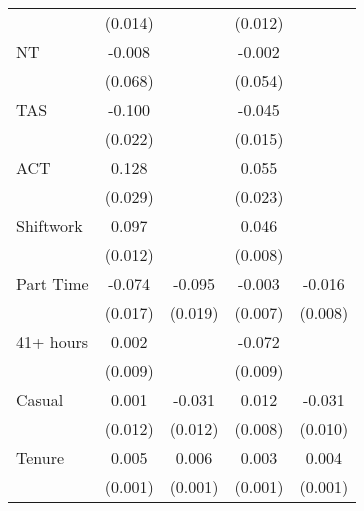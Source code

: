 {\begin{tabular}{l*{4}{c}}
                    &     (0.014)         &                     &     (0.012)         &                     \\
[1em]
NT                  &      -0.008         &                     &      -0.002         &                     \\
                    &     (0.068)         &                     &     (0.054)         &                     \\
[1em]
TAS                 &      -0.100\sym{***}&                     &      -0.045\sym{**} &                     \\
                    &     (0.022)         &                     &     (0.015)         &                     \\
[1em]
ACT                 &       0.128\sym{***}&                     &       0.055\sym{*}  &                     \\
                    &     (0.029)         &                     &     (0.023)         &                     \\
[1em]
Shiftwork           &       0.097\sym{***}&                     &       0.046\sym{***}&                     \\
                    &     (0.012)         &                     &     (0.008)         &                     \\
[1em]
Part Time           &      -0.074\sym{***}&      -0.095\sym{***}&      -0.003         &      -0.016\sym{*}  \\
                    &     (0.017)         &     (0.019)         &     (0.007)         &     (0.008)         \\
[1em]
41+ hours           &       0.002         &                     &      -0.072\sym{***}&                     \\
                    &     (0.009)         &                     &     (0.009)         &                     \\
[1em]
Casual              &       0.001         &      -0.031\sym{*}  &       0.012         &      -0.031\sym{**} \\
                    &     (0.012)         &     (0.012)         &     (0.008)         &     (0.010)         \\
[1em]
Tenure              &       0.005\sym{***}&       0.006\sym{***}&       0.003\sym{***}&       0.004\sym{***}\\
                    &     (0.001)         &     (0.001)         &     (0.001)         &     (0.001)         \\

\end{tabular}}
